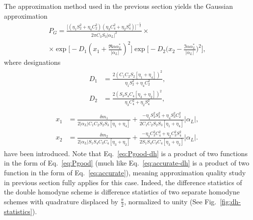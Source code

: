 The approximation method used in the previous section yields the Gaussian approximation
\begin{multline}
P_G=\frac{\biggl[(\eta_1S_2^2+\eta_4C_2^2)(\eta_3C_4^2+\eta_2S_4^2)\biggr]^{-\frac{1}{2}}}{2\pi C_3S_3|\alpha_L|^2}\times\\\times \exp \biggl[-D_1\left(x_1+\frac{\Re\alpha\alpha_L^*}{|\alpha_L|}\right)^2\biggr]\exp \biggl[-D_2\biggl(x_2-\frac{\Im\alpha\alpha_L^*}{|\alpha_L|}\biggr)^2\biggr], \label{eq:Pgood-dh}
\end{multline}
where designations
\begin{align}
    \begin{split}
D_1&=\frac{2(C_1C_2S_2[\eta_1+\eta_4])^{2}}{\eta_1S_2^2+\eta_4C_2^2},\\
    D_2&=\frac{2(S_3S_4C_4[\eta_3+\eta_2])^2}{\eta_3C_4^2+\eta_2S_4^2},
    \end{split}\label{eq:dh-D}
\end{align}
\begin{align}
    \begin{split}
x_1&=\frac{\delta m_1}{2|\alpha_L|C_1C_2S_2S_3[\eta_1+\eta_4]}+\frac{-\eta_1S_2^2S_3^2+\eta_4S_3^2C_2^2}{2C_1C_2S_2S_3[\eta_1+\eta_4]}|\alpha_L|, \\
    x_2&=\frac{\delta m_2}{2|\alpha_L|S_1S_4C_3C_4[\eta_3+\eta_2]}+\frac{-\eta_3C_3^2C_4^2+\eta_2C_3^2S_4^2}{2S_1S_4C_3C_4[\eta_3+\eta_2]}|\alpha_L|
    .
    \end{split}\label{eq:dh-x}
\end{align}
have been introduced. Note that Eq.~\eqref{eq:Pgood-dh} is a product of two functions in the form of Eq.~\eqref{eq:Pgood} (much like Eq.~\eqref{eq:accurate-dh} is a product of two function in the form of Eq.~\eqref{eq:accurate}), meaning approximation quality study in previous section fully applies for this case. Indeed, the difference statistics of the double homodyne scheme is difference statistics of two separate homodyne schemes with quadrature displaced by $\frac{\pi}{2}$, normalized to unity (See Fig.~\ref{fig:dh-statistics}). 

